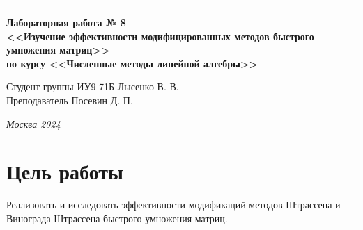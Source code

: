 \documentclass[a4paper, 14pt]{extarticle}
\begin{document}
\begin{titlepage}
\vspace*{-16pt}
\hspace{30pt}\rule{0.866\textwidth}{0.4pt}
  
\vspace{11em}

\begin{center}
\Large {\bf Лабораторная работа № 8} \\ 
\large {\bf<<Изучение эффективности модифицированных методов быстрого умножения матриц>>} \\ 
\large {\bf по курсу <<Численные методы линейной алгебры>>} \\ 
\end{center}\normalsize

\vspace{8em}


\begin{flushright}
  {Студент группы ИУ9-71Б Лысенко В. В.\hspace*{15pt} \\
  \vspace{2ex}
  Преподаватель Посевин Д. П.\hspace*{15pt}}
\end{flushright}

\bigskip

\vfill
 

\begin{center}
\textsl{Москва 2024}
\end{center}
\end{titlepage}

\renewcommand{\ttdefault}{pcr}

\setlength{\tabcolsep}{3pt}
\newpage
\setcounter{page}{2}

\section{Цель работы}\label{Sect::task}
\par
\renewcommand{\labelenumii}{\arabic{enumi}.\arabic{enumii}.}
Реализовать и исследовать эффективности модификаций методов Штрассена и Винограда-Штрассена быстрого умножения матриц.
\end{document}
